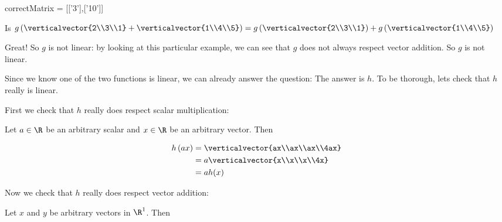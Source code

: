 \documentclass{ximera}
\begin{document}
\begin{question}
\begin{solution}
\begin{hint}
\begin{question}
\begin{solution}
        	 \begin{matrix-answer}[name=v]
    			  correctMatrix = [['3'],['10']]
        	 \end{matrix-answer}
        	\end{solution}
        	\begin{solution}
        		Is $g\left( \verticalvector{2\\3\\1}+\verticalvector{1\\4\\5}\right) = g\left(\verticalvector{2\\3\\1}\right)+g\left( \verticalvector{1\\4\\5}\right)$
        		\begin{multiple-choice}
        		\end{multiple-choice}
        	\end{solution}
        	
        	Great!  So $g$ is not linear:  by looking at this particular example, we can see that $g$ does not always respect vector addition.  So $g$ is not linear.
		
        	Since we know one of the two functions is linear, we can already answer the question:  The answer is $h$.  To be thorough, lets check that $h$ really is linear.
		
        	First we check that $h$ really does respect scalar multiplication:
		
        	Let $a \in \R$ be an arbitrary scalar and $x \in \R$ be an arbitrary vector.  Then
		
        	\begin{align*}
        	 h\left(ax\right) &= \verticalvector{ax\\ax\\ax\\4ax}\\
        	 &= a\verticalvector{x\\x\\x\\4x}\\
        	 &= ah(x)
        	 \end{align*}
		 
        	 Now we check that $h$ really does respect vector addition:
		 
        	 Let $x$ and $y$ be arbitrary vectors in $\R^1$.  Then
		 

\end{question}
\end{hint}
\end{solution}
\end{question}
\end{document}
